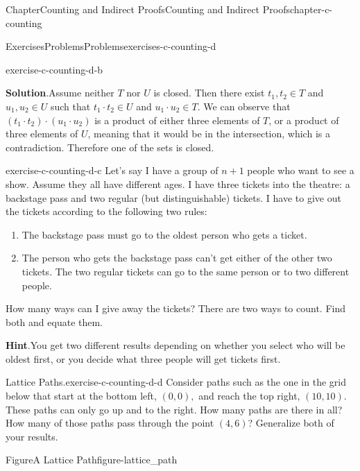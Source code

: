 \documentclass[oneside,10pt,]{book}
\newcommand{\blocktitlefont}{\relax}
\numberwithin{equation}{section}
\begin{document}
\begin{chapterptx}{Chapter}{Counting and Indirect Proofs}{}{Counting and Indirect Proofs}{}{}{chapter-c-counting}
\begin{exercises-section}{Exercises}{Problems}{}{Problems}{}{}{exercises-c-counting-d}
\begin{divisionexercise}{1}{}{}{exercise-c-counting-d-b}
\par\smallskip%
\noindent\textbf{\blocktitlefont Solution}.\hypertarget{solution-c-counting-d-b-b}{}\quad{}Assume neither \(T\) nor \(U\) is closed.  Then there exist \(t_1, t_2\in T\) and \(u_1, u_2 \in U\) such that \(t_1\cdot t_2 \in U\) and \(u_1 \cdot u_2 \in T\).  We can observe that \((t_1\cdot t_2)\cdot(u_1 \cdot u_2)\) is a product of either three elements of \(T\), or a product of three elements of \(U\), meaning that it would be in the intersection, which is a contradiction.  Therefore one of the sets is closed.%
\end{divisionexercise}%
\begin{divisionexercise}{2}{}{}{exercise-c-counting-d-c}%
Let's say I have a group of \(n+1\) people who want to see a show. Assume they all have different ages.  I have three tickets into the theatre: a backstage pass and two regular (but distinguishable) tickets. I have to give out the tickets according to the following two rules:%
\begin{enumerate}[label=(\alph*)]
\item{}The backstage pass must go to the oldest person who gets a ticket.%
\item{}The person who gets the backstage pass can't get either of the other two tickets. The two regular tickets can go to the same person or to two different people.%
\end{enumerate}
How many ways can I give away the tickets? There are two ways to count. Find both and equate them.%
\par\smallskip%
\noindent\textbf{\blocktitlefont Hint}.\hypertarget{hint-c-counting-d-c-b}{}\quad{}You get two different results depending on whether you select who will be oldest first, or you decide what three people will get tickets first.%
\end{divisionexercise}%
\begin{divisionexercise}{3}{Lattice Paths.}{}{exercise-c-counting-d-d}%
%
Consider paths such as the one in the grid below that start at the bottom left, \((0,0),\) and reach the top right, \((10,10)\).  These paths can only go up and to the right.  How many paths are there in all? How many of those paths pass through the point \((4,6)\)?  Generalize both of your results.%
\begin{figureptx}{Figure}{A Lattice Path}{figure-lattice_path}{}%
\begin{image}{0.2}{0.6}{0.2}%

\end{image}
\end{figureptx}
\end{divisionexercise}
\end{exercises-section}
\end{chapterptx}
\end{document}
